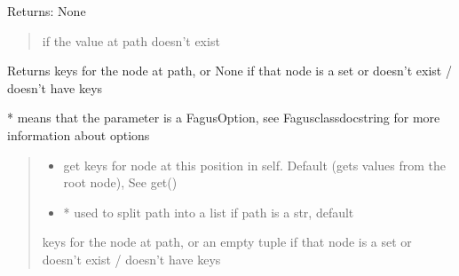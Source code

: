 \documentclass[a4paper,10pt,english]{sphinxmanual}
\begin{document}
\begin{fulllineitems}
\begin{fulllineitems}
\sphinxAtStartPar
Returns: None
\begin{quote}\begin{description}
\sphinxAtStartPar
{} \textendash{} if the value at path doesn’t exist

\end{description}\end{quote}

\end{fulllineitems}


\begin{fulllineitems}
\label{\detokenize{fagus:fagus.Fagus.keys}}
\pysigstartsignatures
{}
\pysigstopsignatures
\sphinxAtStartPar
Returns keys for the node at path, or None if that node is a set or doesn’t exist / doesn’t have keys

\sphinxAtStartPar
* means that the parameter is a FagusOption, see Fagus\sphinxhyphen{}class\sphinxhyphen{}docstring for more information about options
\begin{quote}\begin{description}
\begin{itemize}
\item {}
\sphinxAtStartPar
{} \textendash{} get keys for node at this position in self. Default  (gets values from the root node), See get()

\item {}
\sphinxAtStartPar
{} \textendash{} * used to split path into a list if path is a str, default 

\end{itemize}

\sphinxAtStartPar
keys for the node at path, or an empty tuple if that node is a set or doesn’t exist / doesn’t have keys


\end{description}
\end{quote}
\end{fulllineitems}
\end{fulllineitems}
\end{document}
